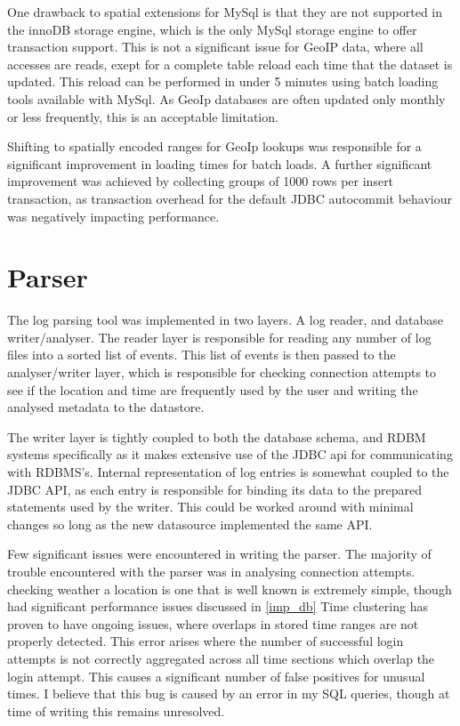 One drawback to spatial extensions for MySql is that they are not supported in the innoDB storage engine, which is the only MySql storage engine to offer transaction support. This is not a significant issue for GeoIP data, where all accesses are reads, exept for a complete table reload each time that the dataset is updated. This reload can be performed in under 5 minutes using batch loading tools available with MySql. As GeoIp databases are often updated only monthly or less frequently, this is an acceptable limitation. 

Shifting to spatially encoded ranges for GeoIp lookups was responsible for a significant improvement in loading times for batch loads. A further significant improvement was achieved by collecting groups of 1000 rows per insert transaction, as transaction overhead for the default JDBC autocommit behaviour was negatively impacting performance. 
 
\section{Parser}

The log parsing tool was implemented in two layers. A log reader, and database writer/analyser. 
The reader layer is responsible for reading any number of log files into a sorted list of events.
This list of events is then passed to the analyser/writer layer, which is responsible for checking connection attempts to see if the location and time are frequently used by the user and writing the analysed metadata to the datastore.

The writer layer is tightly coupled to both the database schema, and RDBM systems specifically as it makes extensive use of the JDBC api for communicating with RDBMS's.
Internal representation of log entries is somewhat coupled to the JDBC API, as each entry is responsible for binding its data to the prepared statements used by the writer.
This could be worked around with minimal changes so long as the new datasource implemented the same API.

Few significant issues were encountered in writing the parser. 
The majority of trouble encountered with the parser was in analysing connection attempts. checking weather a location  is one that is well known is extremely simple, though had significant performance issues discussed in \ref{imp_db}
Time clustering has proven to have ongoing issues, where overlaps in stored time ranges are not properly detected. This error arises where the number of successful login attempts is not correctly aggregated across all time sections which overlap the login attempt. This causes a significant number of false positives for unusual times. I believe that this bug is caused by an error in my SQL queries, though at time of writing this remains unresolved. 

